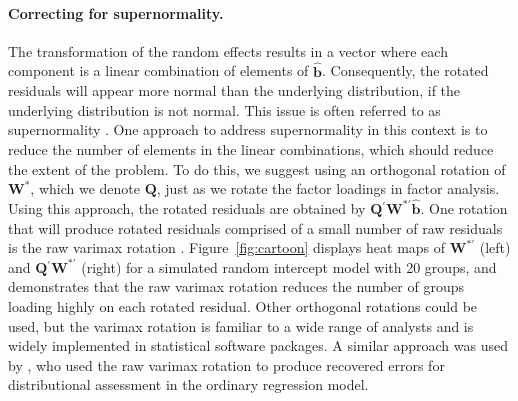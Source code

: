 \documentclass[12pt]{article} %
\newcommand{\hh}[1]{{\color{orange} #1}}
\newcommand{\al}[1]{{\color{red} #1}}
\newcommand{\trans}{\ensuremath{^\prime}}
\begin{document}
\paragraph{Correcting for supernormality.}
The transformation of the random effects results in a vector where each component is a linear combination of elements of $\widehat{\bm{b}}$. Consequently, the rotated residuals will appear more normal than the underlying distribution, if the underlying distribution is not normal. This issue is often referred to as supernormality \citep{Atkinson:1985}. One approach to address supernormality in this context is to reduce the number of elements in the linear combinations, which should reduce the extent of the problem. To do this, we suggest using an orthogonal rotation of $\bm{W}^*$, which we denote $\bm{Q}$, just as we rotate the factor loadings in factor analysis. Using this approach, the rotated residuals are obtained by $\bm{Q}\trans \bm{W}^{*\prime} \widehat{\bm{b}}$. One rotation that will produce rotated residuals comprised of a small number of raw residuals is the raw varimax rotation \citep{Johnson:2007}. Figure~\ref{fig:cartoon} displays heat maps of $\bm{W}^{*\prime}$ (left) and $\bm{Q}\trans\bm{W}^{*\prime}$ (right) for a simulated random intercept model with 20 groups, and demonstrates that the raw varimax rotation reduces the number of groups loading highly on each rotated residual. %
Other orthogonal rotations could be used, but the varimax rotation is familiar to a wide range of analysts and is widely implemented in statistical software packages. A similar approach was used by \cite{Jensen:1999iu}, who used the raw varimax rotation to produce recovered errors for distributional assessment in the ordinary regression model.
\end{document}
